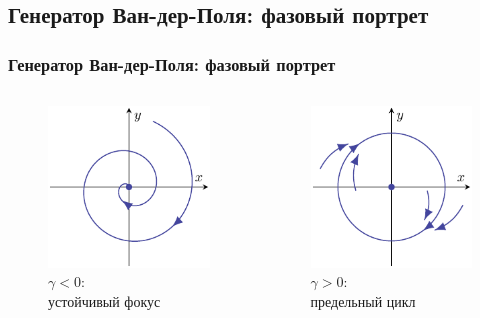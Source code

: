 \subsection{Генератор Ван-дер-Поля: фазовый портрет}
\begin{frame}[t]
	\frametitle{Генератор Ван-дер-Поля: фазовый портрет}
	\vspace{-1.2em}
		
	\begin{columns}
		\begin{column}{0.49\textwidth}
			\begin{figure}[h]
				\centering
				\includegraphics[scale=0.99]{img/img_2a}
				\caption{$\gamma<0$:\\ устойчивый фокус}
			\end{figure}
		\end{column}
		\begin{column}{0.49\textwidth}
			\begin{figure}[h]
				\centering
				\includegraphics[scale=0.99]{img/img_2b}
				\caption{$\gamma>0$:\\ предельный цикл}
			\end{figure}
		\end{column}
	\end{columns}	

\end{frame}
